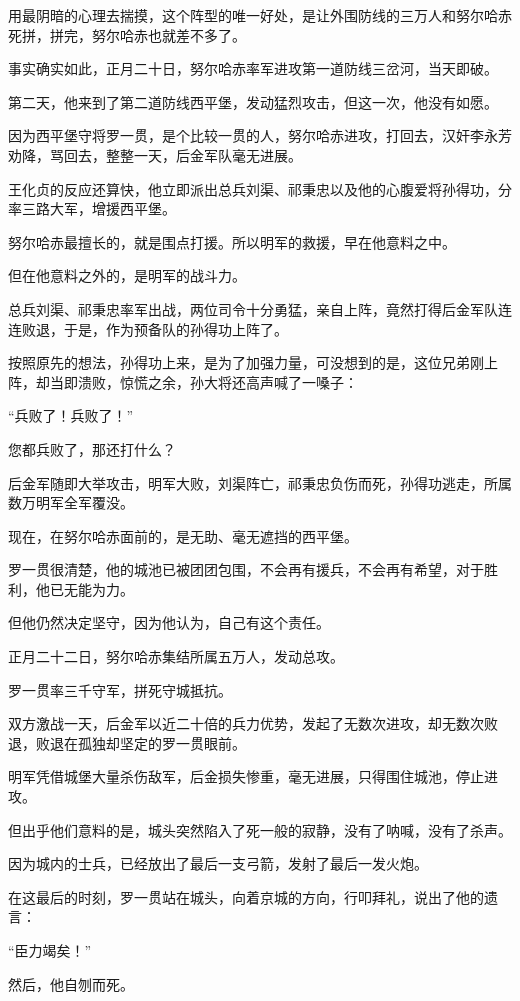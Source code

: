 \begin{multicols}{\theparacolNo}
		用最阴暗的心理去揣摸，这个阵型的唯一好处，是让外围防线的三万人和努尔哈赤死拼，拼完，努尔哈赤也就差不多了。

		事实确实如此，正月二十日，努尔哈赤率军进攻第一道防线三岔河，当天即破。

		第二天，他来到了第二道防线西平堡，发动猛烈攻击，但这一次，他没有如愿。

		因为西平堡守将罗一贯，是个比较一贯的人，努尔哈赤进攻，打回去，汉奸李永芳劝降，骂回去，整整一天，后金军队毫无进展。

		王化贞的反应还算快，他立即派出总兵刘渠、祁秉忠以及他的心腹爱将孙得功，分率三路大军，增援西平堡。

		努尔哈赤最擅长的，就是围点打援。所以明军的救援，早在他意料之中。

		但在他意料之外的，是明军的战斗力。

		总兵刘渠、祁秉忠率军出战，两位司令十分勇猛，亲自上阵，竟然打得后金军队连连败退，于是，作为预备队的孙得功上阵了。

		按照原先的想法，孙得功上来，是为了加强力量，可没想到的是，这位兄弟刚上阵，却当即溃败，惊慌之余，孙大将还高声喊了一嗓子：

		“兵败了！兵败了！”

		您都兵败了，那还打什么？

		后金军随即大举攻击，明军大败，刘渠阵亡，祁秉忠负伤而死，孙得功逃走，所属数万明军全军覆没。

		现在，在努尔哈赤面前的，是无助、毫无遮挡的西平堡。

		罗一贯很清楚，他的城池已被团团包围，不会再有援兵，不会再有希望，对于胜利，他已无能为力。

		但他仍然决定坚守，因为他认为，自己有这个责任。

		正月二十二日，努尔哈赤集结所属五万人，发动总攻。

		罗一贯率三千守军，拼死守城抵抗。

		双方激战一天，后金军以近二十倍的兵力优势，发起了无数次进攻，却无数次败退，败退在孤独却坚定的罗一贯眼前。

		明军凭借城堡大量杀伤敌军，后金损失惨重，毫无进展，只得围住城池，停止进攻。

		但出乎他们意料的是，城头突然陷入了死一般的寂静，没有了呐喊，没有了杀声。

		因为城内的士兵，已经放出了最后一支弓箭，发射了最后一发火炮。

		在这最后的时刻，罗一贯站在城头，向着京城的方向，行叩拜礼，说出了他的遗言：

		“臣力竭矣！”

		然后，他自刎而死。


\end{multicols}
